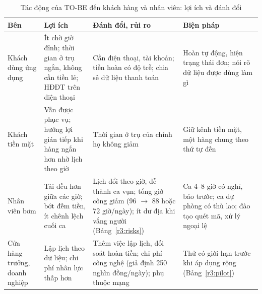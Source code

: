 \begin{table}[htb]\centering\footnotesize
\caption{Tác động của TO-BE đến khách hàng và nhân viên: lợi ích và đánh đổi}\label{r1:tobe-impacts}
\begin{tabularx}{\linewidth}{@{}p{24mm}Y Y Y@{}}
\toprule
Bên & Lợi ích & Đánh đổi, rủi ro & Biện pháp \\
\midrule
Khách dùng ứng dụng & Ít chờ giờ đỉnh; thời gian ở trụ ngắn, không cần tiền lẻ; HĐĐT trên điện thoại & Cần điện thoại, tài khoản; tiền hoàn có độ trễ; chia sẻ dữ liệu thanh toán & Hoàn tự động, hiện trạng thái đơn; nói rõ dữ liệu được dùng làm gì \\
Khách tiền mặt & Vẫn được phục vụ; hưởng lợi gián tiếp khi hàng ngắn hơn nhờ lịch theo giờ & Thời gian ở trụ của chính họ không giảm & Giữ kênh tiền mặt, một hàng chung theo thứ tự đến \\
Nhân viên bơm & Tải đều hơn giữa các giờ; bớt đếm tiền, ít chênh lệch cuối ca & Lịch đổi theo giờ, dễ thành ca vụn; tổng giờ công giảm (96 $\to$ 88 hoặc 72 giờ/ngày); ít dư địa khi vắng người (Bảng~\ref{r3:risks}) & Ca 4--8 giờ có nghỉ, báo trước; ca dự phòng có thù lao; đào tạo quét mã, xử lý ngoại lệ \\
Cửa hàng trưởng, doanh nghiệp & Lập lịch theo dữ liệu; chi phí nhân lực thấp hơn & Thêm việc lập lịch, đối soát hoàn tiền; chi phí công nghệ (giả định 250 nghìn đồng/ngày); phụ thuộc mạng & Thử có giới hạn trước khi áp dụng rộng (Bảng~\ref{r3:pilot}) \\
\bottomrule
\end{tabularx}
\end{table}

